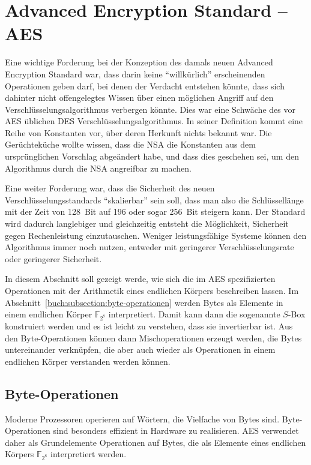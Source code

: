 %
%
%
\section{Advanced Encryption Standard -- AES
\label{buch:section:aes}}
Eine wichtige Forderung bei der Konzeption des damals neuen
Advanced Encryption Standard war, dass darin keine ``willkürlich''
erscheinenden Operationen geben darf, bei denen der Verdacht
entstehen könnte, dass sich dahinter nicht offengelegtes Wissen
über einen möglichen Angriff auf den Verschlüsselungsalgorithmus
verbergen könnte.
Dies war eine Schwäche des vor AES üblichen DES Verschlüsselungsalgorithmus.
In seiner Definition kommt eine Reihe von Konstanten vor, über deren
Herkunft nichts bekannt war.
Die Gerüchteküche wollte wissen, dass die NSA die Konstanten aus dem
ursprünglichen Vorschlag abgeändert habe, und dass dies geschehen sei,
um den Algorithmus durch die NSA angreifbar zu machen.

Eine weiter Forderung war, dass die Sicherheit des neuen
Verschlüsselungsstandards ``skalierbar'' sein soll, dass man also
die Schlüssellänge mit der Zeit von 128~Bit auf 196 oder sogar 256~Bit
steigern kann.
Der Standard wird dadurch langlebiger und gleichzeitig entsteht die
Möglichkeit, Sicherheit gegen Rechenleistung einzutauschen.
Weniger leistungsfähige Systeme können den Algorithmus immer noch
nutzen, entweder mit geringerer Verschlüsselungsrate oder geringerer
Sicherheit.

In diesem Abschnitt soll gezeigt werde, wie sich die im AES
spezifizierten Operationen mit der Arithmetik 
eines endlichen Körpers beschreiben lassen.
Im Abschnitt~\ref{buch:subsection:byte-operationen} werden
Bytes als Elemente in einem endlichen Körper $\mathbb{F}_{2^8}$
interpretiert.
Damit kann dann die sogenannte $S$-Box konstruiert werden und
es ist leicht zu verstehen, dass sie invertierbar ist.
Aus den Byte-Operationen können dann Mischoperationen erzeugt
werden, die Bytes untereinander verknüpfen, die aber auch wieder
als Operationen in einem endlichen Körper verstanden werden können.

\subsection{Byte-Operationen
\label{buch:subsection:byte-operationen}}
Moderne Prozessoren operieren auf Wörtern, die Vielfache von Bytes sind.
Byte-Operationen sind besonders effizient in Hardware zu realisieren.
AES verwendet daher als Grundelemente Operationen auf Bytes, die als
Elemente eines endlichen Körpers $\mathbb{F}_{2^8}$ interpretiert werden.

